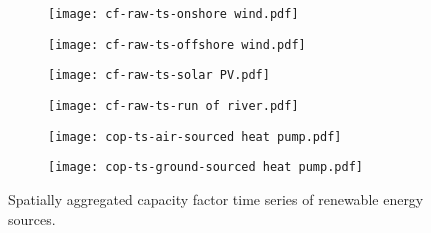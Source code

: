 \begin{figure}
    \centering
        \begin{subfigure}[t]{0.49\textwidth}
            \centering
        \texttt{[image: cf-raw-ts-onshore wind.pdf]}
    \end{subfigure}
    \begin{subfigure}[t]{0.49\textwidth}
        \centering
        \texttt{[image: cf-raw-ts-offshore wind.pdf]}
    \end{subfigure}
    \begin{subfigure}[t]{0.49\textwidth}
        \centering
        \texttt{[image: cf-raw-ts-solar PV.pdf]}
    \end{subfigure}
    \begin{subfigure}[t]{0.49\textwidth}
        \centering
        \texttt{[image: cf-raw-ts-run of river.pdf]}
    \end{subfigure}
    \begin{subfigure}[t]{0.49\textwidth}
        \centering
        \texttt{[image: cop-ts-air-sourced heat pump.pdf]}
    \end{subfigure}
    \begin{subfigure}[t]{0.49\textwidth}
        \centering
        \texttt{[image: cop-ts-ground-sourced heat pump.pdf]}
    \end{subfigure}
    \caption{Spatially aggregated capacity factor time series of renewable energy sources.}
    \label{fig:cfs-ts}
\end{figure}

